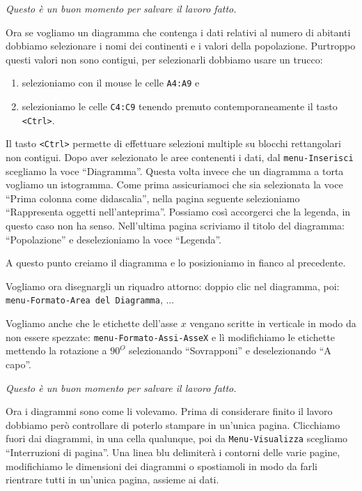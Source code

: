 \emph{Questo è un buon momento per salvare il lavoro fatto.}

Ora se vogliamo un diagramma che contenga i dati relativi al numero di
abitanti dobbiamo selezionare i nomi dei continenti e i valori della
popolazione.
Purtroppo questi valori non sono contigui, per selezionarli
dobbiamo usare un trucco:

\begin{enumerate} [noitemsep]
\item selezioniamo con il mouse le celle \texttt{A4:A9} e
\item selezioniamo le celle \texttt{C4:C9} tenendo premuto contemporaneamente
il tasto \texttt{\textless{}Ctrl\textgreater{}}.
\end{enumerate}

Il tasto \texttt{\textless{}Ctrl\textgreater{}} permette di effettuare selezioni 
multiple su blocchi
rettangolari non contigui.
Dopo aver selezionato le aree contenenti i dati,
dal \texttt{menu-Inserisci} scegliamo la voce ``Diagramma''.
Questa volta invece che un diagramma a torta vogliamo un istogramma.
Come prima assicuriamoci che sia selezionata la voce
``Prima colonna come didascalia'', nella pagina seguente selezioniamo
``Rappresenta oggetti nell'anteprima''.
Possiamo così accorgerci che la legenda, in questo caso non ha senso.
Nell'ultima pagina scriviamo il titolo del diagramma: ``Popolazione'' e
deselezioniamo la voce ``Legenda''.

A questo punto creiamo il diagramma e lo posizioniamo in fianco al
precedente.

Vogliamo ora disegnargli un riquadro attorno: doppio clic nel diagramma,
poi: \texttt{menu-Formato-Area del Diagramma}, ...

Vogliamo anche che le etichette dell'asse $x$ vengano scritte in
verticale in modo da non essere spezzate: \texttt{menu-Formato-Assi-AsseX} e
lì modifichiamo le etichette mettendo la rotazione a $90^O$
selezionando ``Sovrapponi'' e deselezionando ``A capo''.

\emph{Questo è un buon momento per salvare il lavoro fatto.}

Ora i diagrammi sono come li volevamo.
Prima di considerare finito il lavoro dobbiamo però controllare di poterlo
stampare in un'unica pagina.
Clicchiamo fuori dai diagrammi, in una cella qualunque,
poi da \texttt{Menu-Visualizza} scegliamo ``Interruzioni di pagina''.
Una linea blu delimiterà i contorni delle varie pagine, modifichiamo le
dimensioni dei diagrammi o spostiamoli in modo da farli rientrare tutti
in un'unica pagina, assieme ai dati.

